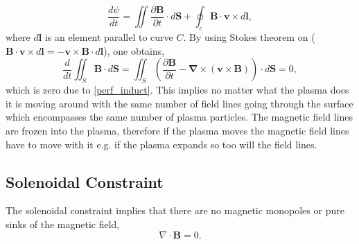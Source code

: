 \documentclass[12pt]{ociamthesis}
\newcommand{\bs}[1]{\boldsymbol{#1}}
\newcommand{\bn}{\boldsymbol{\nabla}}
\begin{document}
\begin{equation}
    \frac{d \psi}{ dt} = \iint \frac{\partial \bs{B}}{ \partial t} \cdot d\bs{S} + \oint_c  \bs{B} \cdot \bs{v} \times d\bs{l},
\end{equation}
where $d\bs{l}$ is an element parallel to curve $C$. By using Stokes theorem on ($\bs{B} \cdot \bs{v} \times d\bs{l} = - \bs{v} \times \bs{B} \cdot d \bs{l}$), one obtains,
\begin{equation}
    \frac{d}{dt} \iint_S \bs{B} \cdot d \bs{S} = \iint_S \left( \frac{\partial \boldsymbol{B}}{\partial t} - \bn \times (\boldsymbol{v} \times \boldsymbol{B})  \right) \cdot d\bs{S} = 0, 
\end{equation}
which is zero due to \eqref{perf_induct}. This implies no matter what the plasma does it is moving around with the same number of field lines going through the surface which encompasses the same number of plasma particles. The magnetic field lines are frozen into the plasma, therefore if the plasma moves the magnetic field lines have to move with it e.g. if the plasma expands so too will the field lines.
\subsection{Solenoidal Constraint}
\label{section:cont_eq}
The solenoidal constraint implies that there are no magnetic monopoles or pure sinks of the magnetic field,
\begin{equation}\label{eq90}
\nabla \cdot \boldsymbol{B} = 0.
\end{equation}
\end{document}
